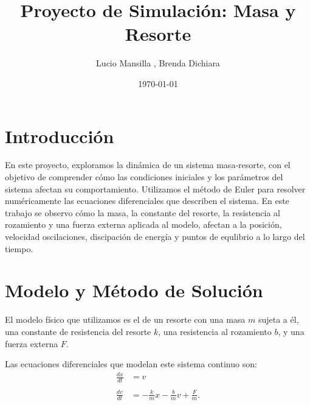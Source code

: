 \documentclass[]{article}
\title{\textbf{Proyecto de Simulación: Masa y Resorte}}
\author{Lucio Mansilla , Brenda Dichiara}
\date{\today}
\begin{document}
\maketitle

\section{Introducción}
En este proyecto, exploramos la dinámica de un sistema masa-resorte, con el objetivo de comprender cómo las condiciones iniciales y los parámetros del sistema afectan su comportamiento. Utilizamos el método de Euler para resolver numéricamente las ecuaciones diferenciales que describen el sistema. En este trabajo se observo cómo la masa, la constante del resorte, la resistencia al rozamiento y una fuerza externa aplicada al modelo, afectan a la posición, velocidad oscilaciones, discipación de energía y puntos de equlibrio a lo largo del tiempo.

\section{Modelo y Método de Solución}
El modelo físico que utilizamos es el de un resorte con una masa $m$ sujeta a él, una constante de resistencia del resorte $k$, una resistencia al rozamiento $b$, y una fuerza externa $F$.

\vspace{0.1cm}
\begin{center}
\end{center}
Las ecuaciones diferenciales que modelan este sistema continuo son:
\begin{align*}
    \frac{dx}{dt} & = v \\\\ 
    \frac{dv}{dt} & = -\frac{k}{m}x - \frac{b}{m}v + \frac{F}{m}.
\end{align*}
\end{document}
